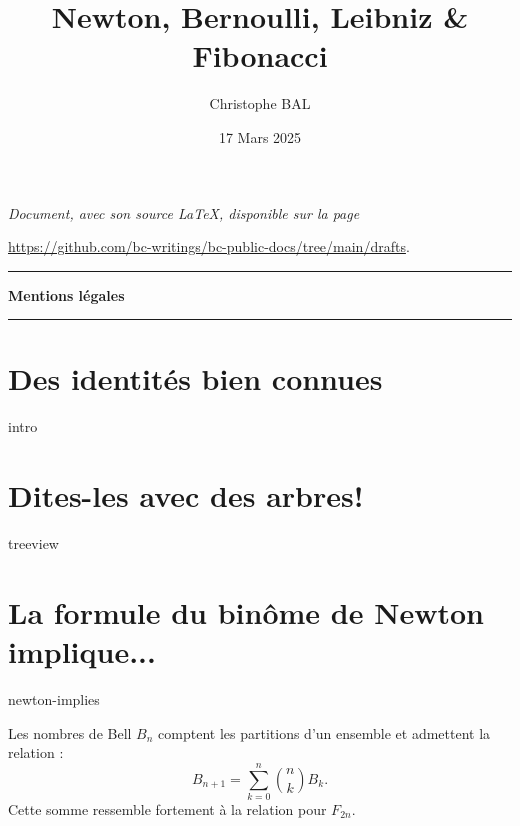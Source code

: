 \documentclass[12pt]{amsart}
\begin{document}
\title{Newton, Bernoulli, Leibniz \& Fibonacci}
\author{Christophe BAL}
\date{17 Mars 2025}

\maketitle

\begin{center}
	\itshape
	Document, avec son source \LaTeX, disponible sur la page

	\url{https://github.com/bc-writings/bc-public-docs/tree/main/drafts}.
\end{center}


\bigskip


\begin{center}
	\hrule\vspace{.3em}
	{
		\fontsize{1.35em}{1em}\selectfont
		\textbf{Mentions \og légales \fg}
	}

	\vspace{0.45em}
	\doclicenseThis
	\hrule
\end{center}


\bigskip


\setcounter{tocdepth}{1}
\tableofcontents



\newpage

\section{Des identités bien connues}

{intro}


\section{Dites-les avec des arbres!}

{treeview}



\section{La formule du binôme de Newton implique...}

{newton-implies}




Les nombres de Bell \( B_n \) comptent les partitions d'un ensemble et admettent la relation :
\[
B_{n+1} = \sum_{k=0}^{n} \binom{n}{k} B_k.
\]  
Cette somme ressemble fortement à la relation pour \( F_{2n} \).
\end{document}
